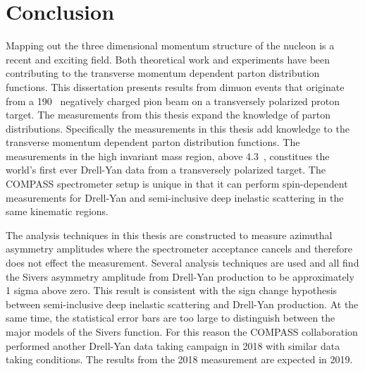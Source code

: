 \chapter{Conclusion}
\label{ch::conclusion}

Mapping out the three dimensional momentum structure of the nucleon is a recent
and exciting field.  Both theoretical work and experiments have been
contributing to the transverse momentum dependent parton distribution functions.
This dissertation presents results from dimuon events that originate from a
190~{\gvc} negatively charged pion beam on a transversely polarized proton
target.  The measurements from this thesis expand the knowledge of parton
distributions.  Specifically the measurements in this thesis add knowledge to
the transverse momentum dependent parton distribution functions.  The
measurements in the high invariant mass region, above 4.3~{\gvcw}, constitues
the world's first ever Drell-Yan data from a transversely polarized target.  The
COMPASS spectrometer setup is unique in that it can perform spin-dependent
measurements for Drell-Yan and semi-inclusive deep inelastic scattering in the
same kinematic regions.

The analysis techniques in this thesis are constructed to measure azimuthal
asymmetry amplitudes where the spectrometer acceptance cancels and therefore
does not effect the measurement.  Several analysis techniques are used and all
find the Sivers asymmetry amplitude from Drell-Yan production to be
approximately 1 sigma above zero.  This result is consistent with the sign
change hypothesis between semi-inclusive deep inelastic scattering and Drell-Yan
production.  At the same time, the statistical error bars are too large to
distinguish between the major models of the Sivers function.  For this reason
the COMPASS collaboration performed another Drell-Yan data taking campaign in
2018 with similar data taking conditions.  The results from the 2018 measurement
are expected in 2019.
